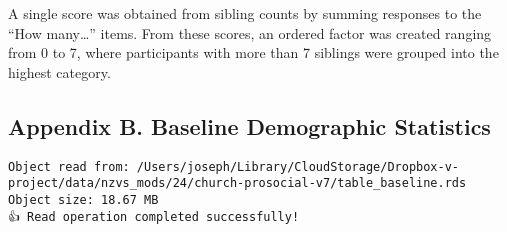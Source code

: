 \documentclass[
  single column]{article}
\begin{document}
A single score was obtained from sibling counts by summing responses to
the ``How many\ldots{}'' items. From these scores, an ordered factor was
created ranging from 0 to 7, where participants with more than 7
siblings were grouped into the highest category.

\newpage{}

\subsection{Appendix B. Baseline Demographic
Statistics}\label{appendix-demographics}

\begin{verbatim}
Object read from: /Users/joseph/Library/CloudStorage/Dropbox-v-project/data/nzvs_mods/24/church-prosocial-v7/table_baseline.rds
Object size: 18.67 MB
👍 Read operation completed successfully!
\end{verbatim}
\end{document}
